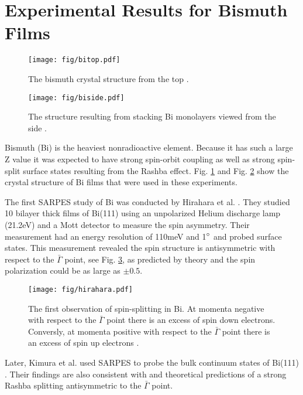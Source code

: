 \documentclass[12pt]{article}
\begin{document}
\section{Experimental Results for Bismuth Films}
\begin{figure}[th]
  \centering
  \texttt{[image: fig/bitop.pdf]}
  \caption{The bismuth crystal structure from the top \cite{Shirasawa}.}
  \label{fig:bitop}
\end{figure}
\begin{figure}[th]
  \centering
  \texttt{[image: fig/biside.pdf]}
  \caption{The structure resulting from stacking Bi monolayers viewed from the side \cite{Shirasawa}.}
  \label{fig:biside}
\end{figure}
Bismuth (Bi) is the heaviest nonradioactive element.
Because it has such a large Z value it was expected to have strong spin-orbit coupling as well as strong spin-split surface states resulting from the Rashba effect.
Fig. \ref{fig:bitop} and Fig. \ref{fig:biside} show the crystal structure of Bi films that were used in these experiments.

The first SARPES study of Bi was conducted by Hirahara et al. \cite{Hirahara}.
They studied 10 bilayer thick films of Bi(111) using an unpolarized Helium discharge lamp (21.2eV) and a Mott detector to measure the spin asymmetry.
Their measurement had an energy resolution of 110meV and 1$\degree$ and probed surface states.
This measurement revealed the spin structure is antisymmetric with respect to the $\bar{\Gamma}$ point, see Fig. \ref{fig:hirahara}, as predicted by theory and the spin polarization could be as large as $\pm 0.5$.
\begin{figure}[h]
  \centering
  \texttt{[image: fig/hirahara.pdf]}
  \caption{The first observation of spin-splitting in Bi.  At momenta negative with respect to the $\bar{\Gamma}$ point there is an excess of spin down electrons.  Conversly, at momenta positive with respect to the $\bar{\Gamma}$ point there is an excess of spin up electrons \cite{Hirahara}.}
  \label{fig:hirahara}
\end{figure}
Later, Kimura et al. used SARPES to probe the bulk continuum states of Bi(111) \cite{Kimura}.
Their findings are also consistent with \cite{Hirahara} and theoretical predictions of a strong Rashba splitting antisymmetric to the $\bar{\Gamma}$ point.
\end{document}
